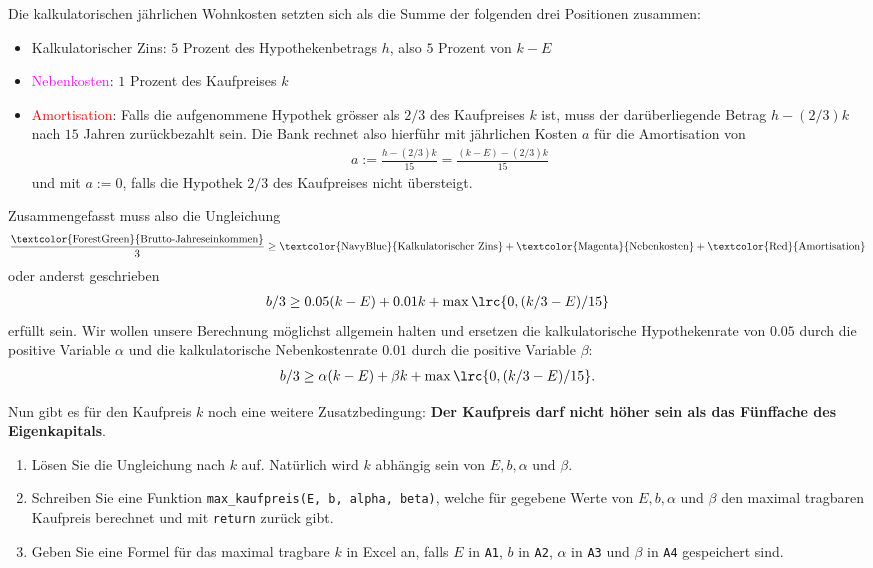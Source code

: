 \begin{myexercise}
	Die kalkulatorischen jährlichen Wohnkosten setzten sich als die Summe der folgenden drei Positionen zusammen:
	\begin{itemize}
		\item \textcolor{NavyBlue}{Kalkulatorischer Zins}: $5$ Prozent des Hypothekenbetrags $h$, also $5$ Prozent von $k - E$
		\item \textcolor{Magenta}{Nebenkosten}: $1$ Prozent des Kaufpreises $k$
		\item \textcolor{Red}{Amortisation}: Falls die aufgenommene Hypothek grösser als $2/3$ des Kaufpreises $k$ ist, muss der darüberliegende Betrag $h - (2 / 3) k$ nach $15$ Jahren zurückbezahlt sein. Die Bank rechnet also hierführ mit jährlichen Kosten $a$ für die Amortisation von
		      \begin{align*}
			      a := \frac{h - (2 / 3) k}{15} = \frac{(k - E) - (2 / 3) k}{15}
		      \end{align*}
		      und mit $a := 0$, falls die Hypothek $2 / 3$ des Kaufpreises nicht übersteigt.
	\end{itemize}
	Zusammengefasst muss also die Ungleichung
	\begin{align*}
		\frac{\text{\textcolor{ForestGreen}{Brutto-Jahreseinkommen}}}{3} \geq \text{\textcolor{NavyBlue}{Kalkulatorischer Zins}} + \text{\textcolor{Magenta}{Nebenkosten}} + \text{\textcolor{Red}{Amortisation}}
	\end{align*}
	oder anderst geschrieben
	\begin{align*}
		b / 3 \geq 0.05(k - E) + 0.01k + \max\lrc{0, (k/3 - E) / 15}
	\end{align*}
	erfüllt sein. Wir wollen unsere Berechnung möglichst allgemein halten und ersetzen die kalkulatorische Hypothekenrate von $0.05$ durch die positive Variable $\alpha$ und die kalkulatorische Nebenkostenrate $0.01$ durch die positive Variable $\beta$:
	\begin{align}\label{eq:Ungleichung_k}
		b / 3 \geq \alpha (k - E) + \beta k + \max\lrc{0, (k/3 - E) / 15}.
	\end{align}

	Nun gibt es für den Kaufpreis $k$ noch eine weitere Zusatzbedingung: \textbf{Der Kaufpreis darf nicht höher sein als das Fünffache des Eigenkapitals}.

	\begin{enumerate}
		\item Lösen Sie die Ungleichung nach $k$ auf. Natürlich wird $k$ abhängig sein von $E, b, \alpha$ und $\beta$.
		\item Schreiben Sie eine Funktion \lstinline|max_kaufpreis(E, b, alpha, beta)|, welche für gegebene Werte von $E, b, \alpha$ und $\beta$ den maximal tragbaren Kaufpreis berechnet und mit \lstinline|return| zurück gibt.
		\item Geben Sie eine Formel für das maximal tragbare $k$ in Excel an, falls $E$ in \texttt{A1}, $b$ in \texttt{A2}, $\alpha$ in \texttt{A3} und $\beta$ in \texttt{A4} gespeichert sind.
	\end{enumerate}


\end{myexercise}
